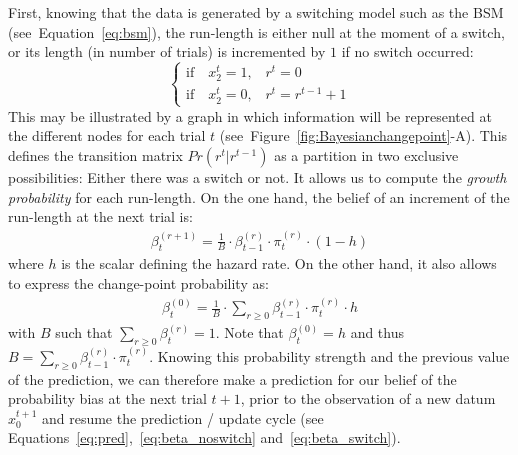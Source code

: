 \documentclass[12pt,english]{article}%
\newcommand{\choice}[1]{ %
	\left\{ %
		\begin{array}{l} #1 \end{array} %
	\right. }
\newcommand{\eql}[1]{\begin{equation}#1\end{equation}}
\newcommand{\eqa}[1]{\begin{align}#1\end{align}}
\newcommand{\Ll}{\mathcal{L}}
\newcommand{\seeFig}[1]{Figure~\ref{fig:#1}}
\newcommand{\seeEq}[1]{Equation~\ref{eq:#1}}
\begin{document}
First, knowing that the data is generated by a switching model such as the BSM (see~\seeEq{bsm}),
the run-length is either null at the moment of a switch,
or its length (in number of trials) is incremented by $1$ if no switch occurred:
\eql{\choice{
\text{if} \quad x_2^t=1 \text{,} \quad r^t = 0\\
\text{if} \quad x_2^t=0 \text{,} \quad r^t = r^{t-1} +1 }\label{eq:run_length}}%
This may be illustrated by a graph
in which information will be represented at the different nodes for each trial $t$ (see~\seeFig{Bayesianchangepoint}-A).
This defines the transition matrix $Pr(r^t | r^{t-1})$ 
as a partition in two exclusive possibilities: 
Either there was a switch or not.
It allows us to compute the \emph{growth probability} for each run-length. %
On the one hand, the belief of an increment of the run-length at the next trial is: %
\eqa{
\beta^{(r+1)}_t = \frac{1}{B} \cdot \beta^{(r)}_{t-1} \cdot \pi^{(r)}_{t} \cdot (1-h)
\label{eq:beta_noswitch}
}
where $h$ is the scalar defining the hazard rate. 
On the other hand, it also allows to express the change-point probability as:
\eqa{
\beta^{(0)}_t  = \frac{1}{B} \cdot \sum_{r \geq 0} \beta^{(r)}_{t-1} \cdot \pi^{(r)}_{t} \cdot h
\label{eq:beta_switch}
}
with $B$ such that $\sum_{r \geq 0} \beta^{(r)}_{t} = 1$.
Note that $\beta^{(0)}_t=h$ and thus $B=\sum_{r \geq 0} \beta^{(r)}_{t-1} \cdot \pi^{(r)}_{t}$.
Knowing this probability strength and the previous value of the prediction, %
we can therefore make a prediction for our belief of the probability bias at the next trial $t+1$,
prior to the observation of a new datum $x_0^{t+1}$ and resume the prediction / update cycle (see Equations~\ref{eq:pred},~\ref{eq:beta_noswitch} and~\ref{eq:beta_switch}).
\end{document}
